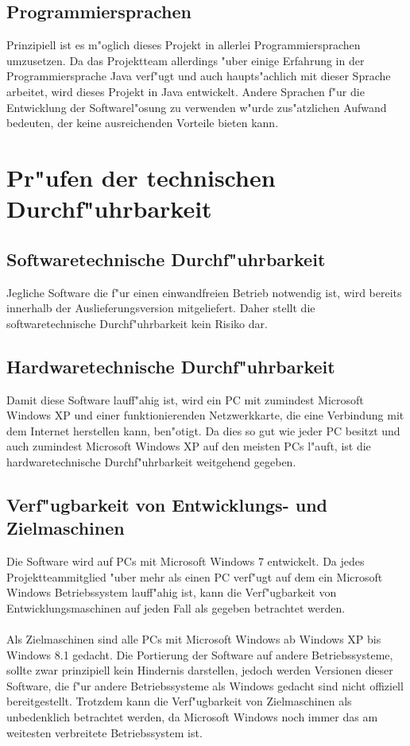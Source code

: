 \documentclass[a4paper,12pt]{scrreprt}
\begin{document}
		\subsection{Programmiersprachen}
		
		Prinzipiell ist es m"oglich dieses Projekt in allerlei Programmiersprachen umzusetzen. Da das Projektteam allerdings "uber einige Erfahrung in der Programmiersprache Java verf"ugt und auch haupts"achlich mit dieser Sprache arbeitet, wird dieses Projekt in Java entwickelt. Andere Sprachen f"ur die Entwicklung der Softwarel"osung zu verwenden w"urde zus"atzlichen Aufwand bedeuten, der keine ausreichenden Vorteile bieten kann.
		
	\section{Pr"ufen der technischen Durchf"uhrbarkeit}
		\subsection{Softwaretechnische Durchf"uhrbarkeit}
		
		Jegliche Software die f"ur einen einwandfreien Betrieb notwendig ist, wird bereits innerhalb der Auslieferungsversion mitgeliefert. Daher stellt die softwaretechnische Durchf"uhrbarkeit kein Risiko dar.
		
		\subsection{Hardwaretechnische Durchf"uhrbarkeit}
			
		Damit diese Software lauff"ahig ist, wird ein PC mit zumindest Microsoft Windows XP und einer funktionierenden Netzwerkkarte, die eine Verbindung mit dem Internet herstellen kann, ben"otigt. Da dies so gut wie jeder PC besitzt und auch zumindest Microsoft Windows XP auf den meisten PCs l"auft, ist die hardwaretechnische Durchf"uhrbarkeit weitgehend gegeben.
		
			
		\subsection{Verf"ugbarkeit von Entwicklungs- und Zielmaschinen}
			
	Die Software wird auf PCs mit Microsoft Windows 7 entwickelt. Da jedes Projektteammitglied "uber mehr als einen PC verf"ugt auf dem ein Microsoft Windows Betriebssystem lauff"ahig ist, kann die Verf"ugbarkeit von Entwicklungsmaschinen auf jeden Fall als gegeben betrachtet werden.\\\\Als Zielmaschinen sind alle PCs mit Microsoft Windows ab Windows XP bis Windows 8.1 gedacht. Die Portierung der Software auf andere Betriebssysteme, sollte zwar prinzipiell kein Hindernis darstellen, jedoch werden Versionen dieser Software, die f"ur andere Betriebssysteme als Windows gedacht sind nicht offiziell bereitgestellt. Trotzdem kann die Verf"ugbarkeit von Zielmaschinen als unbedenklich betrachtet werden, da Microsoft Windows noch immer das am weitesten verbreitete Betriebssystem ist.
			
\end{document}

